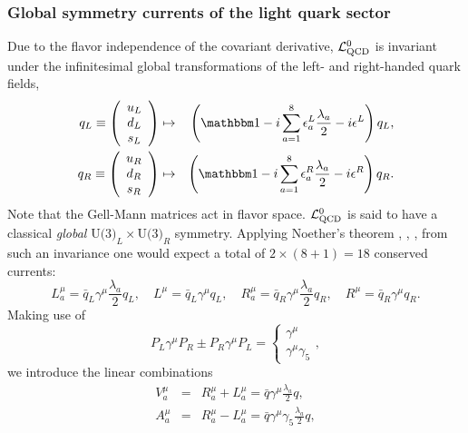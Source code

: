 \documentclass[twoside,12pt]{article}
\begin{document}
\subsubsection{Global symmetry currents of the light quark sector}
\label{subsubsec_agsl}
    Due to the flavor independence of the covariant derivative,
${\cal L}^0_{\rm QCD}$ is invariant under the infinitesimal global transformations
of the left- and right-handed quark fields,
\begin{eqnarray}
\label{2:1:3:u3lu3r}
q_L\equiv
\left(\begin{array}{c}u_L\\d_L\\s_L\end{array}\right)&\mapsto&
\left({\mathbbm 1}-i\sum_{a=1}^8
\epsilon^L_a\frac{\lambda_a}{2}-i\epsilon^L\right)q_L,\nonumber\\
q_R\equiv\left(\begin{array}{c}u_R\\d_R\\s_R\end{array}\right) &\mapsto& \left({\mathbbm 1}-i\sum_{a=1}^8
\epsilon^R_a\frac{\lambda_a}{2}-i\epsilon^R\right)q_R.
\end{eqnarray}
   Note that the Gell-Mann matrices act in flavor space.
   ${\cal L}^0_{\rm QCD}$ is said to have a classical
{\em global} $\mbox{U(3)}_L\times\mbox{U(3)}_R$ symmetry.
   Applying Noether's theorem \cite{Noether:1918}, \cite{Hill:1951}, \cite{Gell-Mann:1960np},
from such an invariance one would expect a total of $2\times(8+1)=18$ conserved currents:
\begin{equation}
\label{2:1:3:str} L^{\mu}_a=\bar{q}_L\gamma^\mu \frac{\lambda_a}{2}q_L,\quad
L^{\mu}=\bar{q}_L\gamma^\mu q_L,\quad
R^{\mu}_a=\bar{q}_R\gamma^\mu \frac{\lambda_a}{2}q_R,\quad
R^{\mu}=\bar{q}_R\gamma^\mu q_R.
\end{equation}
Making use of
\begin{displaymath}
P_L\gamma^\mu P_R\pm P_R\gamma^\mu P_L
=\left\{\begin{array}{l}\gamma^\mu\\\gamma^\mu\gamma_5\end{array}\right.,
\end{displaymath}
we introduce the linear combinations
\begin{eqnarray}
\label{2:1:3:v}
V^{\mu}_a&=& R^{\mu}_a+L^{\mu}_a=\bar{q}\gamma^\mu\frac{\lambda_a}{2}q,\\
\label{2:1:3:a}
A^{\mu}_a&=&R^{\mu}_a-L^{\mu}_a=\bar{q}\gamma^\mu\gamma_5
\frac{\lambda_a}{2}q,
\end{eqnarray}
\end{document}
